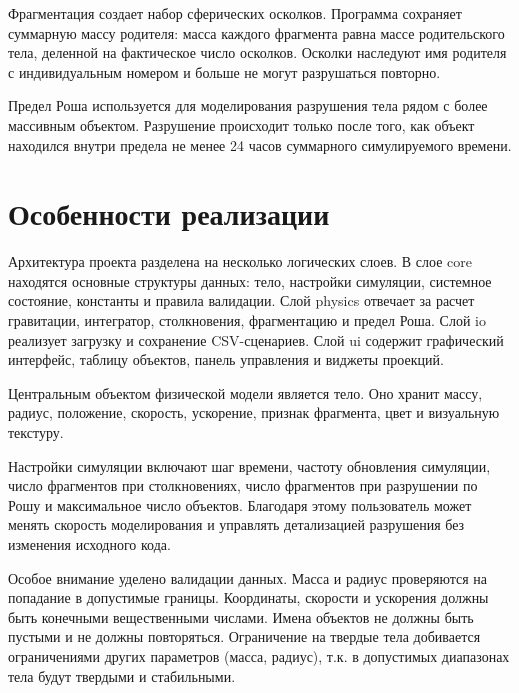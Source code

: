 \documentclass[14pt,a4paper]{extarticle}
\begin{document}
	Фрагментация создает набор сферических осколков. Программа сохраняет суммарную массу родителя: масса каждого фрагмента равна массе родительского тела, деленной на фактическое число осколков. Осколки наследуют имя родителя с индивидуальным номером и больше не могут разрушаться повторно. %
	
	Предел Роша используется для моделирования разрушения тела рядом с более массивным объектом.  Разрушение происходит только после того, как объект находился внутри предела не менее 24 часов суммарного симулируемого времени.%
		
	\section{Особенности реализации}
	
	Архитектура проекта разделена на несколько логических слоев. В слое core находятся основные структуры данных: тело, настройки симуляции, системное состояние, константы и правила валидации. Слой physics отвечает за расчет гравитации, интегратор, столкновения, фрагментацию и предел Роша. Слой io реализует загрузку и сохранение CSV-сценариев. Слой ui содержит графический интерфейс, таблицу объектов, панель управления и виджеты проекций.
	
	Центральным объектом физической модели является тело. Оно хранит массу, радиус, положение, скорость, ускорение, признак фрагмента, цвет и визуальную текстуру. %
	
	Настройки симуляции включают шаг времени, частоту обновления симуляции, число фрагментов при столкновениях, число фрагментов при разрушении по Рошу и максимальное число объектов. Благодаря этому пользователь может менять скорость моделирования и управлять детализацией разрушения без изменения исходного кода.
	
	Особое внимание уделено валидации данных. Масса и радиус проверяются на попадание в допустимые границы. Координаты, скорости и ускорения должны быть конечными вещественными числами. Имена объектов не должны быть пустыми и не должны повторяться. Ограничение на твердые тела добивается ограничениями других параметров (масса, радиус), т.к. в допустимых диапазонах тела будут твердыми и стабильными. %
	
\end{document}
